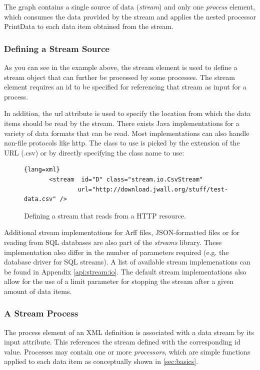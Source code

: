 The graph contains a single source of data ({\em stream}) and only
one {\em process} element, which consumes the data provided by the
stream and applies the nested processor {\ttfamily PrintData} to
each data item obtained from the stream.

\subsubsection{\label{sec:defineStream}Defining a Stream Source}
As you can see in the example above, the {\ttfamily stream} element is used to define
a stream object that can further be processed by some processes. The {\ttfamily stream}
element requires an {\ttfamily id} to be specified for referencing that stream as input
for a process. 

In addition, the {\ttfamily url} attribute is used to specify the location
from which the data items should be read by the stream. There exists Java implementations
for a variety of data formats that can be read. Most implementations can also handle 
non-file protocols like {\ttfamily http}. The class to use is picked by the extension
of the URL ({\ttfamily .csv}) or by directly specifying the class name to use:
\begin{figure}[h!]{\footnotesize
    \centering
    \begin{lstlisting}{lang=xml}
       <stream  id="D" class="stream.io.CsvStream"
               url="http://download.jwall.org/stuff/test-data.csv" />
    \end{lstlisting}
    \caption{\label{fig:defStream}Defining a stream that reads from a HTTP resource.}
}
\end{figure}

Additional stream implementations for Arff files, JSON-formatted files or for reading 
from SQL databases are also part of the {\em streams} library. These implementation
also differ in the number of parameters required (e.g. the database driver for SQL
streams). A list of available stream implemenations can be found in Appendix \ref{api:stream:io}.
The default stream implementations also allow for the use of a {\ttfamily limit} parameter
for stopping the stream after a given amount of data items.

\subsubsection{A Stream Process}
The {\ttfamily process} element of an XML definition is associated
with a data stream by its {\ttfamily input} attribute. This references
the stream defined with the corresponding {\ttfamily id}
value. Processes may contain one or more {\em processors}, which are
simple functions applied to each data item as conceptually shown in
\ref{sec:basics}.

